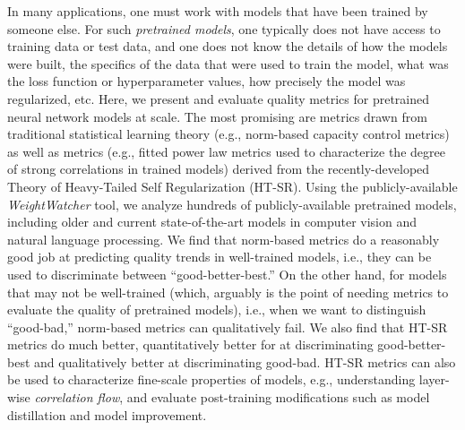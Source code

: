 
In many applications,
one must work with models that have been trained by someone else.
For such \emph{pretrained models}, one typically does not have access to training data or test data, and one does not know the details of how the models were built, the specifics of the data that were used to train the model, what was the loss function or hyperparameter values, how precisely the model was regularized, etc.
Here, we present and evaluate quality metrics for pretrained neural network models at scale.
The most promising are metrics drawn from traditional statistical learning theory (e.g., norm-based capacity control metrics) as well as metrics (e.g., fitted power law metrics used to characterize the degree of strong correlations in trained models) derived from the recently-developed Theory of Heavy-Tailed Self Regularization (HT-SR).
Using the publicly-available \emph{WeightWatcher} tool, we analyze hundreds of publicly-available pretrained models, including older and current state-of-the-art models in computer vision and natural language processing.
We find that norm-based metrics do a reasonably good job at predicting quality trends in well-trained models, i.e., they can be used to discriminate between ``good-better-best.'' 
On the other hand, for models that may not be well-trained (which, arguably is the point of needing metrics to evaluate the quality of pretrained models), i.e., when we want to distinguish ``good-bad,'' norm-based metrics can qualitatively fail. 
We also find that HT-SR metrics do much better, quantitatively better for at discriminating good-better-best and qualitatively better at discriminating good-bad.
HT-SR metrics can also be used to characterize fine-scale properties of models, e.g., understanding layer-wise \emph{correlation flow}, and evaluate post-training modifications such as model distillation and model improvement.


